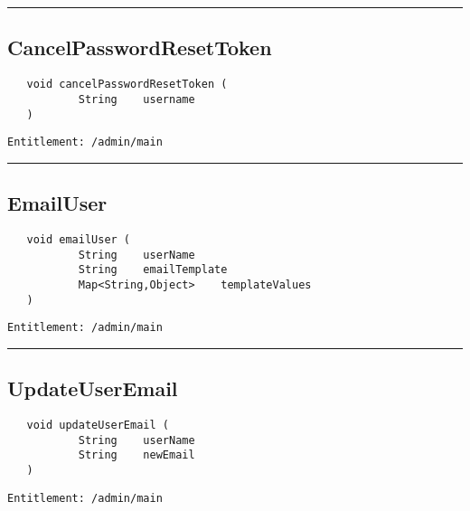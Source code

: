 \rule{12cm}{2pt}
\subsection{CancelPasswordResetToken}
\label{Api:CancelPasswordResetToken}
\begin{Verbatim}
   void cancelPasswordResetToken (
           String    username
   )
\end{Verbatim}
\begin{Verbatim}[formatcom=\color{Maroon}]
  Entitlement: /admin/main
\end{Verbatim}



\rule{12cm}{2pt}
\subsection{EmailUser}
\label{Api:EmailUser}
\begin{Verbatim}
   void emailUser (
           String    userName
           String    emailTemplate
           Map<String,Object>    templateValues
   )
\end{Verbatim}
\begin{Verbatim}[formatcom=\color{Maroon}]
  Entitlement: /admin/main
\end{Verbatim}



\rule{12cm}{2pt}
\subsection{UpdateUserEmail}
\label{Api:UpdateUserEmail}
\begin{Verbatim}
   void updateUserEmail (
           String    userName
           String    newEmail
   )
\end{Verbatim}
\begin{Verbatim}[formatcom=\color{Maroon}]
  Entitlement: /admin/main
\end{Verbatim}



